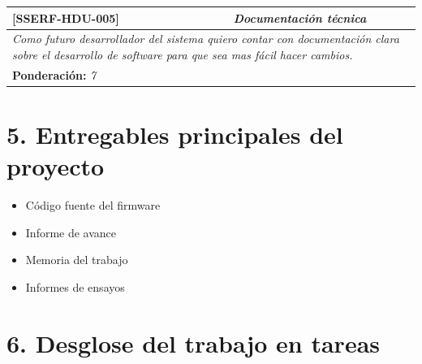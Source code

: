 \documentclass[11pt]{charter}
\begin{document}
\begin{table}[H]
\centering
\begin{tabular}{|l|c|}
\hline
\textbf{[SSERF-HDU-005]} & \textit{Documentación técnica} \\ \hline
\multicolumn{2}{|m{10cm}|}{\textit{Como futuro desarrollador del sistema quiero contar con documentación clara sobre el desarrollo de software para que sea mas fácil hacer cambios.}} \\ \hline
\multicolumn{2}{|l|}{\textbf{Ponderación:} \textit{7}} \\ \hline
\end{tabular}
\end{table}

\section{5. Entregables principales del proyecto}
\label{sec:entregables}

\begin{itemize}
\item Código fuente del firmware
\item Informe de avance
\item Memoria del trabajo
\item Informes de ensayos
\end{itemize}

\section{6. Desglose del trabajo en tareas}
\label{sec:wbs}
\end{document}
